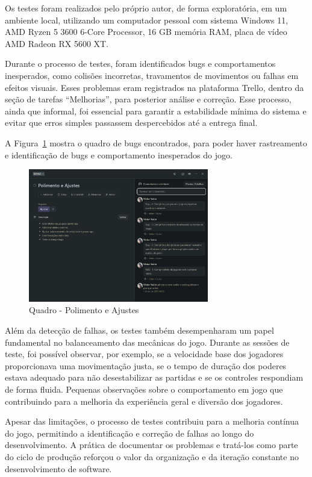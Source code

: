 Os testes foram realizados pelo próprio autor, de forma exploratória, em um ambiente local, utilizando um computador pessoal com sistema Windows 11, AMD Ryzen 5 3600 6-Core Processor, 16 GB memória RAM, placa de vídeo AMD Radeon RX 5600 XT.

Durante o processo de testes, foram identificados bugs e comportamentos inesperados, como colisões incorretas, travamentos de movimentos ou falhas em efeitos visuais. Esses problemas eram registrados na plataforma Trello, dentro da seção de tarefas “Melhorias”, para posterior análise e correção. Esse processo, ainda que informal, foi essencial para garantir a estabilidade mínima do sistema e evitar que erros simples passassem despercebidos até a entrega final.

A Figura~\ref{fig:polimento-e-ajustes} mostra o quadro de bugs encontrados, para poder haver rastreamento e identificação de bugs e comportamento inesperados do jogo.

\begin{figure}[htbp]
    \centering
    \caption{Quadro - Polimento e Ajustes}
    \label{fig:polimento-e-ajustes}
    \includegraphics[width=0.7\textwidth]{figuras/bugs-tcc.png}
\end{figure}

Além da detecção de falhas, os testes também desempenharam um papel fundamental no balanceamento das mecânicas do jogo. Durante as sessões de teste, foi possível observar, por exemplo, se a velocidade base dos jogadores proporcionava uma movimentação justa, se o tempo de duração dos poderes estava adequado para não desestabilizar as partidas e se os controles respondiam de forma fluida. Pequenas observações sobre o  comportamento em jogo que contribuindo para a melhoria da experiência geral e diversão dos jogadores.

Apesar das limitações, o processo de testes contribuiu para a melhoria contínua do jogo, permitindo a identificação e correção de falhas ao longo do desenvolvimento. A prática de documentar os problemas e tratá-los como parte do ciclo de produção reforçou o valor da organização e da iteração constante no desenvolvimento de software.
